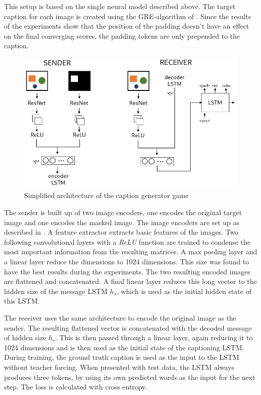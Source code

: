 This setup is based on the single neural model described above.
The target caption for each image is created using the GRE-algorithm of \citet{Dale1995}.
Since the results of the experiments show that the position of the padding doesn't have an effect on the final converging scores, the padding tokens are only prepended to the caption.

\begin{figure}[h]
    \centering
    \includegraphics[width=.7\linewidth]{figures/arch_caption_generator_game.png}
    \caption{Simplified architecture of the caption generator game}
    \label{fig:caption_generator_game_architecture}
\end{figure}

The sender is built up of two image encoders, one encodes the original target image and one encodes the masked image.
The image encoders are set up as described in \citet{Johnson2017}.
A feature extractor extracts basic features of the images.
Two following convolutional layers with a \emph{ReLU} function are trained to condense the most important information from the resulting matrices.
A max pooling layer and a linear layer reduce the dimensions to 1024 dimensions.
This size was found to have the best results during the experiments.
The two resulting encoded images are flattened and concatenated.
A final linear layer reduces this long vector to the hidden size of the message LSTM $h_s$, which is used as the initial hidden state of this LSTM.

The receiver uses the same architecture to encode the original image as the sender.
The resulting flattened vector is concatenated with the decoded message of hidden size $h_r$.
This is then passed through a linear layer, again reducing it to 1024 dimensions and is then used as the initial state of the captioning LSTM.
During training, the ground truth caption is used as the input to the LSTM without teacher forcing.
When presented with test data, the LSTM always produces three tokens, by using its own predicted words as the input for the next step.
The loss is calculated with cross entropy.

